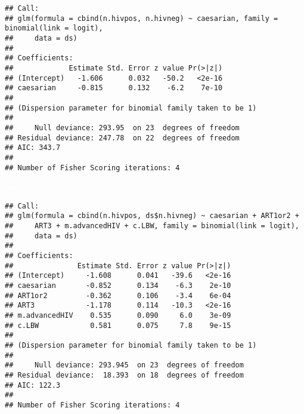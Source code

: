 \documentclass[landscape,twocolumn,letterpaper,9pt,reqno]{article}\usepackage[]{graphicx}\usepackage[]{color}
\newenvironment{knitrout}{}{} %
\begin{document}
\begin{knitrout}\small
{}\color{fgcolor}
\begin{verbatim}
## Call:
## glm(formula = cbind(n.hivpos, n.hivneg) ~ caesarian, family = binomial(link = logit), 
##     data = ds)
## 
## Coefficients:
##             Estimate Std. Error z value Pr(>|z|)
## (Intercept)   -1.606      0.032   -50.2   <2e-16
## caesarian     -0.815      0.132    -6.2    7e-10
## 
## (Dispersion parameter for binomial family taken to be 1)
## 
##     Null deviance: 293.95  on 23  degrees of freedom
## Residual deviance: 247.78  on 22  degrees of freedom
## AIC: 343.7
## 
## Number of Fisher Scoring iterations: 4
\end{verbatim}

\end{knitrout}

\clearpage

\textcolor{white}{text}

\clearpage

\vspace{-0.3in}

\begin{knitrout}\small
{}\color{fgcolor}
\begin{verbatim}
## Call:
## glm(formula = cbind(n.hivpos, ds$n.hivneg) ~ caesarian + ART1or2 + 
##     ART3 + m.advancedHIV + c.LBW, family = binomial(link = logit), 
##     data = ds)
## 
## Coefficients:
##               Estimate Std. Error z value Pr(>|z|)
## (Intercept)     -1.608      0.041   -39.6   <2e-16
## caesarian       -0.852      0.134    -6.3    2e-10
## ART1or2         -0.362      0.106    -3.4    6e-04
## ART3            -1.178      0.114   -10.3   <2e-16
## m.advancedHIV    0.535      0.090     6.0    3e-09
## c.LBW            0.581      0.075     7.8    9e-15
## 
## (Dispersion parameter for binomial family taken to be 1)
## 
##     Null deviance: 293.945  on 23  degrees of freedom
## Residual deviance:  18.393  on 18  degrees of freedom
## AIC: 122.3
## 
## Number of Fisher Scoring iterations: 4
\end{verbatim}

\end{knitrout}

\vspace{-0.22in}
\end{document}

